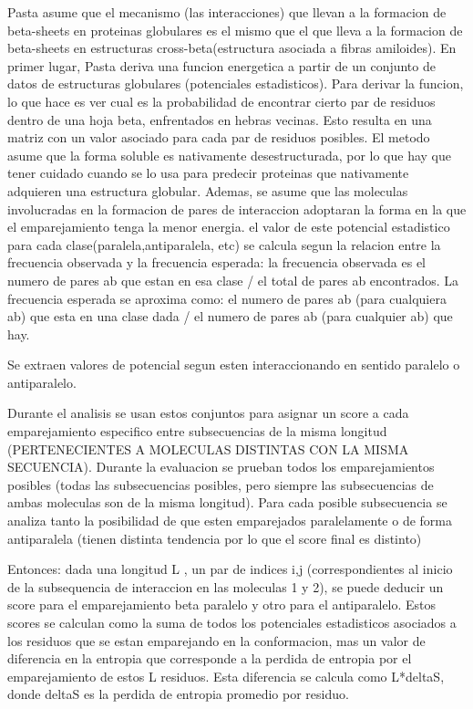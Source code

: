 Pasta asume que el mecanismo (las interacciones) que llevan a la formacion de beta-sheets en proteinas globulares es el mismo que el que lleva a la formacion de beta-sheets en estructuras cross-beta(estructura asociada a fibras amiloides).
En primer lugar, Pasta deriva una funcion energetica a partir de un conjunto de datos de estructuras globulares (potenciales estadisticos). Para derivar la funcion, lo que hace es ver cual es la probabilidad de encontrar cierto par de residuos dentro de una hoja beta, enfrentados en hebras vecinas. Esto resulta en una matriz con un valor asociado para cada par de residuos posibles.
El metodo asume que la forma soluble es nativamente desestructurada, por lo que hay que tener cuidado cuando se lo usa para predecir proteinas que nativamente adquieren una estructura globular.
Ademas, se asume que las moleculas involucradas en la formacion de pares de interaccion adoptaran la forma en la que el emparejamiento tenga la menor energia.
el valor de este potencial estadistico para cada clase(paralela,antiparalela, etc) se calcula segun la relacion entre la frecuencia observada y la frecuencia esperada:
la frecuencia observada es el numero de pares ab que estan en esa clase / el total de pares ab encontrados.
La frecuencia esperada se aproxima como: el numero de pares ab (para cualquiera ab) que esta en una clase dada / el numero de pares ab (para cualquier ab) que hay.

Se extraen valores de potencial segun esten interaccionando en sentido paralelo o antiparalelo.

Durante el analisis se usan estos conjuntos para asignar un score a cada emparejamiento especifico entre subsecuencias de la misma longitud (PERTENECIENTES A MOLECULAS DISTINTAS CON LA MISMA SECUENCIA). Durante la evaluacion se prueban todos los emparejamientos posibles (todas las subsecuencias posibles, pero siempre las subsecuencias de ambas moleculas son de la misma longitud).
Para cada posible subsecuencia se analiza tanto la posibilidad de que esten emparejados paralelamente o de forma antiparalela (tienen distinta tendencia por lo que el score final es distinto)

Entonces: dada una longitud L , un par de indices i,j (correspondientes al inicio de la subsequencia de interaccion en las moleculas 1 y 2), se puede deducir un score para el emparejamiento beta paralelo y otro para el antiparalelo. Estos scores se calculan como la suma de todos los potenciales estadisticos asociados a los residuos que se estan emparejando en la conformacion, mas un valor de diferencia en la entropia que corresponde a la perdida de entropia por el emparejamiento de estos L residuos. Esta diferencia se calcula como L*deltaS, donde deltaS es la perdida de entropia promedio por residuo.


